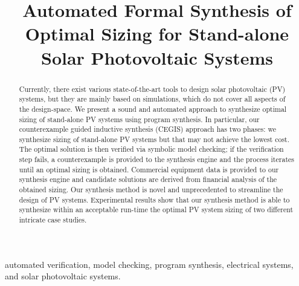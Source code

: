 \documentclass[10pt,conference]{IEEEtran}
\begin{document}
\title{Automated Formal Synthesis of Optimal Sizing for Stand-alone Solar Photovoltaic Systems}
%
%
\maketitle

\begin{abstract}
Currently, there exist various state-of-the-art tools to design solar photovoltaic (PV) systems, but they are mainly based on simulations, which do not cover all aspects of the design-space. We present a sound and automated approach to synthesize optimal sizing of stand-alone PV systems using program synthesis. 
In particular, our counterexample guided inductive synthesis (CEGIS) approach has two phases: we synthesize sizing of stand-alone PV systems but that may not achieve the lowest cost. The optimal solution is then verified via symbolic model checking; if the verification step fails, a counterexample is provided to the synthesis engine and the process iterates until an optimal sizing is obtained. Commercial equipment data is provided to our synthesis engine and candidate solutions are derived from financial analysis of the obtained sizing. Our synthesis method is novel and unprecedented to streamline the design of PV systems. Experimental results show that our synthesis method is able to synthesize within an acceptable run-time the optimal PV system sizing of two different intricate case studies.
\end{abstract}

\begin{IEEEkeywords}
automated verification, model checking, program synthesis, electrical systems, and solar photovoltaic systems.
\end{IEEEkeywords}

\end{document}
